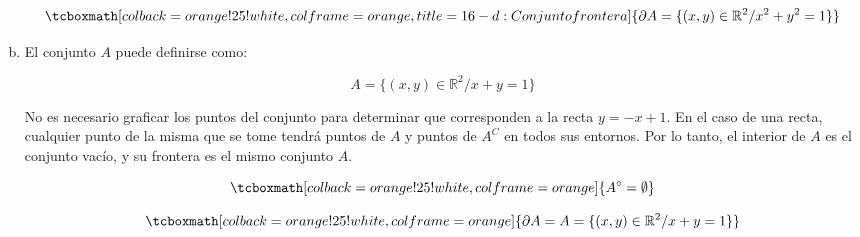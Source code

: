 \documentclass{article}
\renewcommand{\Bbb}{\mathbb}
\begin{document}
\begin{enumerate}[(a)]
\begin{equation}
\tcboxmath[colback=orange!25!white,colframe=orange, title=16-d: Conjunto frontera]
{ \partial{A} = \{ (x, y) \in \Bbb R^2 / x^2 + y^2 = 1 \} }
\end{equation}

\item El conjunto $A$ puede definirse como:

\begin{equation}
A = \{ (x, y) \in \Bbb R^2 / x + y = 1 \}
\end{equation}

No es necesario graficar los puntos del conjunto para determinar que corresponden a la recta $y = -x + 1$. En el caso de una recta, cualquier punto de la misma que se tome tendrá puntos de $A$ y puntos de $A^C$ en todos sus entornos. Por lo tanto, el interior de $A$ es el conjunto vacío, y su frontera es el mismo conjunto $A$.

\begin{equation}
\tcboxmath[colback=orange!25!white,colframe=orange]
{ A^{\circ} = \emptyset }
\end{equation}

\begin{equation}
\tcboxmath[colback=orange!25!white,colframe=orange]
{ \partial{A} = A = \{ (x, y) \in \Bbb R^2 / x + y = 1 \} }
\end{equation}

\end{enumerate}
\end{document}
